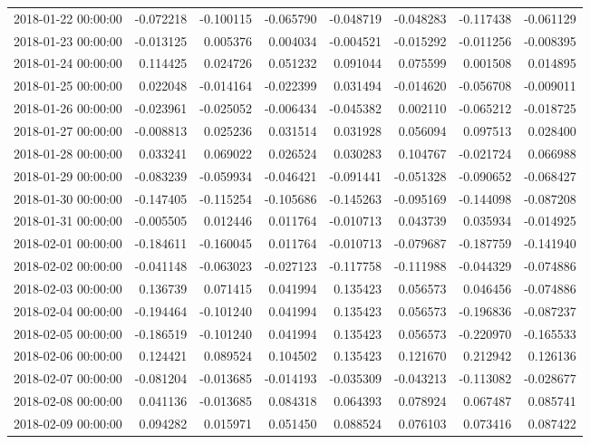 \begin{tabular}{lrrrrrrr}
2018-01-22 00:00:00 & -0.072218 & -0.100115 & -0.065790 & -0.048719 & -0.048283 & -0.117438 & -0.061129 \\
2018-01-23 00:00:00 & -0.013125 & 0.005376 & 0.004034 & -0.004521 & -0.015292 & -0.011256 & -0.008395 \\
2018-01-24 00:00:00 & 0.114425 & 0.024726 & 0.051232 & 0.091044 & 0.075599 & 0.001508 & 0.014895 \\
2018-01-25 00:00:00 & 0.022048 & -0.014164 & -0.022399 & 0.031494 & -0.014620 & -0.056708 & -0.009011 \\
2018-01-26 00:00:00 & -0.023961 & -0.025052 & -0.006434 & -0.045382 & 0.002110 & -0.065212 & -0.018725 \\
2018-01-27 00:00:00 & -0.008813 & 0.025236 & 0.031514 & 0.031928 & 0.056094 & 0.097513 & 0.028400 \\
2018-01-28 00:00:00 & 0.033241 & 0.069022 & 0.026524 & 0.030283 & 0.104767 & -0.021724 & 0.066988 \\
2018-01-29 00:00:00 & -0.083239 & -0.059934 & -0.046421 & -0.091441 & -0.051328 & -0.090652 & -0.068427 \\
2018-01-30 00:00:00 & -0.147405 & -0.115254 & -0.105686 & -0.145263 & -0.095169 & -0.144098 & -0.087208 \\
2018-01-31 00:00:00 & -0.005505 & 0.012446 & 0.011764 & -0.010713 & 0.043739 & 0.035934 & -0.014925 \\
2018-02-01 00:00:00 & -0.184611 & -0.160045 & 0.011764 & -0.010713 & -0.079687 & -0.187759 & -0.141940 \\
2018-02-02 00:00:00 & -0.041148 & -0.063023 & -0.027123 & -0.117758 & -0.111988 & -0.044329 & -0.074886 \\
2018-02-03 00:00:00 & 0.136739 & 0.071415 & 0.041994 & 0.135423 & 0.056573 & 0.046456 & -0.074886 \\
2018-02-04 00:00:00 & -0.194464 & -0.101240 & 0.041994 & 0.135423 & 0.056573 & -0.196836 & -0.087237 \\
2018-02-05 00:00:00 & -0.186519 & -0.101240 & 0.041994 & 0.135423 & 0.056573 & -0.220970 & -0.165533 \\
2018-02-06 00:00:00 & 0.124421 & 0.089524 & 0.104502 & 0.135423 & 0.121670 & 0.212942 & 0.126136 \\
2018-02-07 00:00:00 & -0.081204 & -0.013685 & -0.014193 & -0.035309 & -0.043213 & -0.113082 & -0.028677 \\
2018-02-08 00:00:00 & 0.041136 & -0.013685 & 0.084318 & 0.064393 & 0.078924 & 0.067487 & 0.085741 \\
2018-02-09 00:00:00 & 0.094282 & 0.015971 & 0.051450 & 0.088524 & 0.076103 & 0.073416 & 0.087422 \\

\end{tabular}

